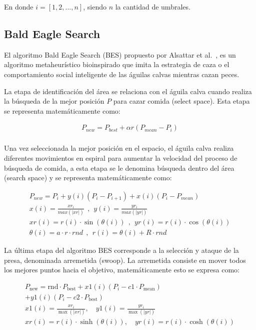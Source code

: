 \documentclass[conference]{IEEEtran}
\begin{document}
\noindent En donde $i=[1,2,...,n]$, siendo $n$ la cantidad de umbrales.

\subsection{Bald Eagle Search}

\noindent El algoritmo Bald Eagle Search (BES) propuesto por Alsattar et al.~\cite{Alsattar2019}, es un algoritmo metaheurístico bioinspirado que imita la estrategia de caza o el comportamiento social inteligente de las águilas calvas mientras cazan peces. 

\noindent La etapa de identificación del área se relaciona con el águila calva cuando realiza la búsqueda de la mejor posición $P$ para cazar comida (select space). Esta etapa se representa matemáticamente como:

\begin{equation}
	\begin{gathered}
		P_{new}=P_{best}+{\alpha}r(P_{mean}-P_{i})\\
	\end{gathered}
	\label{eq11}
\end{equation}

\noindent Una vez seleccionada la mejor posición en el espacio, el águila calva realiza diferentes movimientos en espiral para aumentar la velocidad del proceso de búsqueda de comida, a esta etapa se le denomina búsqueda dentro del área (search space) y se representa matemáticamente como:

\begin{equation}
	\begin{gathered}
		P_{new}=P_{i}+y(i)(P_{i}-P_{i+1})+x(i)(P_{i}-P_{mean}) \\
		x(i)= \frac{xr_{i}}{max(\lvert xr \rvert)} ~\ , ~\ y(i)= \frac{yr_{i}}{max(\lvert yr \rvert)} \\
		xr(i)=r(i)\cdot \sin (\theta(i)) ~\ , ~\ yr(i)=r(i)\cdot \cos (\theta(i)) \\
		\theta(i)=a\cdot r\cdot rnd ~\ , ~\ r(i)=\theta(i)+R \cdot rnd 
	\end{gathered}
	\label{eq12}
\end{equation}

\noindent La última etapa del algoritmo BES corresponde a la selección y ataque de la presa, denominada arremetida (swoop). La arremetida consiste en mover todos los mejores puntos hacia el objetivo, matemáticamente esto se expresa como:

\begin{equation}
	\begin{gathered}
		P_{\text{new}} = \text{rnd} \cdot P_{\text{best}} + x1(i)(P_{i}-c1 \cdot P_{\text{mean}}) \\
		+ y1(i)(P_{i}-c2 \cdot P_{\text{best}}) \\
		x1(i) = \frac{xr_{i}}{\max(\lvert xr \rvert)}, \quad y1(i) = \frac{yr_{i}}{\max(\lvert yr \rvert)} \\
		xr(i) = r(i) \cdot \sinh(\theta(i)), \quad yr(i) = r(i) \cdot \cosh(\theta(i))
	\end{gathered}
	\label{eq13}
\end{equation}
\end{document}
